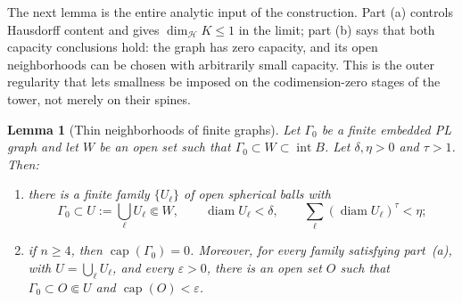 \documentclass[12pt,oneside,a4paper]{article}
\theoremstyle{mytheorem}
\newtheorem{lemma}[definition]{Lemma}
\theoremstyle{remark}
\theoremstyle{definition}
\begin{document}
The next lemma is the entire analytic input of the construction.
Part (a) controls Hausdorff content and gives
$\dim_{\mathcal{H}}K\le1$ in the limit; part (b) says that both
capacity conclusions hold: the graph has zero capacity, and its open
neighborhoods can be chosen with arbitrarily small capacity.  This is the
outer regularity that lets smallness be imposed on the codimension-zero
stages of the tower, not merely on their spines.

\begin{lemma}[Thin neighborhoods of finite graphs]\label{lem:thin}
Let $\Gamma_0$ be a finite embedded PL graph and let
$W$ be an open set such that
$\Gamma_0\subset W\subset\operatorname{int}B$.  Let
$\delta,\eta>0$ and $\tau>1$.  Then:
\begin{enumerate}
\item[(a)] there is a finite family $\{U_\ell\}$ of open
spherical balls with
\[
 \Gamma_0\subset U:=\bigcup_\ell U_\ell\Subset W,
 \qquad
 \operatorname{diam}U_\ell<\delta,
 \qquad
 \sum_\ell(\operatorname{diam}U_\ell)^\tau<\eta;
\]
\item[(b)] if $n\geq4$, then $\operatorname{cap}(\Gamma_0)=0$.  Moreover,
for every family satisfying part~\textup{(a)}, with
$U=\bigcup_\ell U_\ell$, and every $\varepsilon>0$, there is an open set
$O$ such that
$\Gamma_0\subset O\Subset U$ and
$\operatorname{cap}(O)<\varepsilon$.
\end{enumerate}
\end{lemma}
\end{document}
